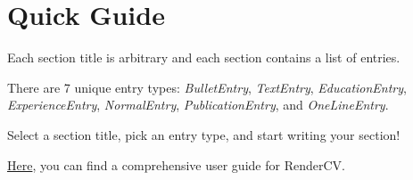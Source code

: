 \documentclass[cvauthor={Dr. Sajid Muhaimin Choudhury}]{buetcv}
\begin{document}
    
    \section{Quick Guide}

    \begin{onecolentry}
        \begin{highlightsforbulletentries}


        \item Each section title is arbitrary and each section contains a list of entries.

        \item There are 7 unique entry types: \textit{BulletEntry}, \textit{TextEntry}, \textit{EducationEntry}, \textit{ExperienceEntry}, \textit{NormalEntry}, \textit{PublicationEntry}, and \textit{OneLineEntry}.

        \item Select a section title, pick an entry type, and start writing your section!

        \item \href{https://docs.rendercv.com/user_guide/}{Here}, you can find a comprehensive user guide for RenderCV.


        \end{highlightsforbulletentries}
    \end{onecolentry}
\end{document}

